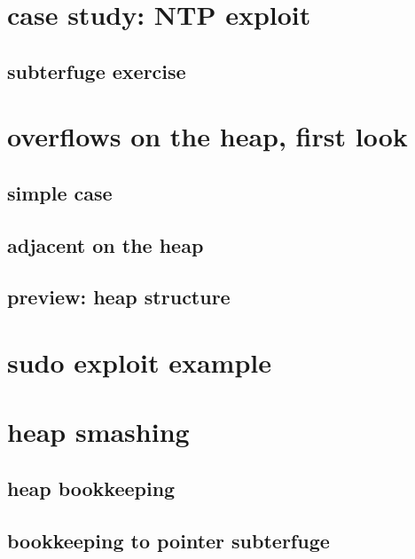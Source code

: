 

\section{case study: NTP exploit}


\subsection{subterfuge exercise}


\section{overflows on the heap, first look}
\subsection{simple case}


\subsection{adjacent on the heap}


\subsection{preview: heap structure}


\section{sudo exploit example}



\section{heap smashing}


\subsection{heap bookkeeping}


\subsection{bookkeeping to pointer subterfuge}


